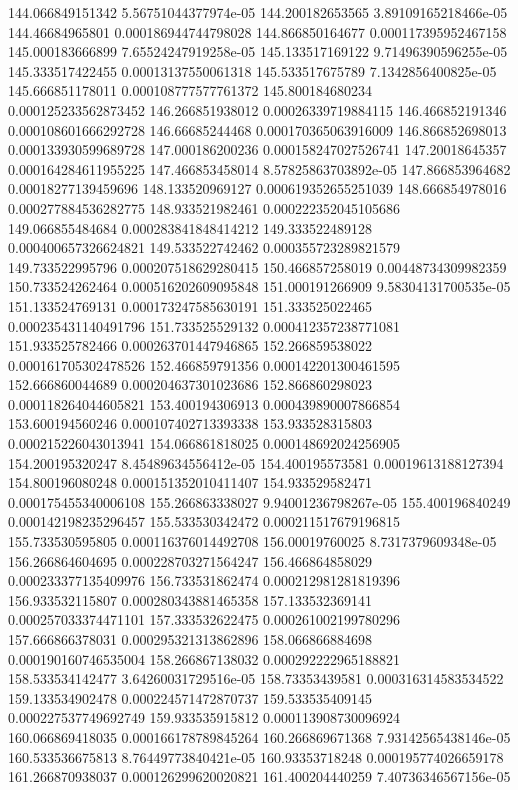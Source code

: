 {144.066849151342 5.56751044377974e-05
144.200182653565 3.89109165218466e-05
144.46684965801 0.000186944744798028
144.866850164677 0.000117395952467158
145.000183666899 7.65524247919258e-05
145.133517169122 9.71496390596255e-05
145.333517422455 0.00013137550061318
145.533517675789 7.1342856400825e-05
145.666851178011 0.000108777577761372
145.800184680234 0.000125233562873452
146.266851938012 0.00026339719884115
146.466852191346 0.000108601666292728
146.66685244468 0.000170365063916009
146.866852698013 0.000133930599689728
147.000186200236 0.000158247027526741
147.20018645357 0.000164284611955225
147.466853458014 8.57825863703892e-05
147.866853964682 0.00018277139459696
148.133520969127 0.000619352655251039
148.666854978016 0.000277884536282775
148.933521982461 0.000222352045105686
149.066855484684 0.000283841848414212
149.333522489128 0.000400657326624821
149.533522742462 0.000355723289821579
149.733522995796 0.000207518629280415
150.466857258019 0.00448734309982359
150.733524262464 0.000516202609095848
151.000191266909 9.58304131700535e-05
151.133524769131 0.000173247585630191
151.333525022465 0.000235431140491796
151.733525529132 0.000412357238771081
151.933525782466 0.000263701447946865
152.266859538022 0.000161705302478526
152.466859791356 0.000142201300461595
152.666860044689 0.000204637301023686
152.866860298023 0.000118264044605821
153.400194306913 0.000439890007866854
153.600194560246 0.000107402713393338
153.933528315803 0.000215226043013941
154.066861818025 0.000148692024256905
154.200195320247 8.45489634556412e-05
154.400195573581 0.00019613188127394
154.800196080248 0.000151352010411407
154.933529582471 0.000175455340006108
155.266863338027 9.94001236798267e-05
155.400196840249 0.000142198235296457
155.533530342472 0.000211517679196815
155.733530595805 0.000116376014492708
156.00019760025 8.7317379609348e-05
156.266864604695 0.000228703271564247
156.466864858029 0.000233377135409976
156.733531862474 0.000212981281819396
156.933532115807 0.000280343881465358
157.133532369141 0.000257033374471101
157.333532622475 0.000261002199780296
157.666866378031 0.000295321313862896
158.066866884698 0.000190160746535004
158.266867138032 0.000292222965188821
158.533534142477 3.64260031729516e-05
158.73353439581 0.000316314583534522
159.133534902478 0.000224571472870737
159.533535409145 0.000227537749692749
159.933535915812 0.000113908730096924
160.066869418035 0.000166178789845264
160.266869671368 7.93142565438146e-05
160.533536675813 8.76449773840421e-05
160.93353718248 0.000195774026659178
161.266870938037 0.000126299620020821
161.400204440259 7.40736346567156e-05
}
